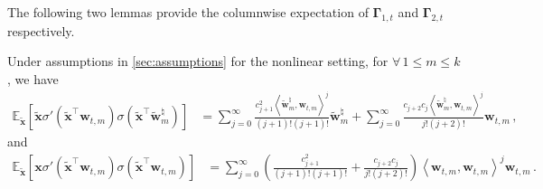 The following two lemmas provide the columnwise expectation of $\bm \Gamma_{1,t}$ and $\bm \Gamma_{2,t}$ respectively.
\begin{lemma}
\label{I-expectation}
Under assumptions in \cref{sec:assumptions} for the nonlinear setting, for $\forall\,1\leq m \leq k$, we have
    \begin{align}\label{sigma-target-model-corr}
    \mathbb{E}_{\widetilde{\bm x}}\left[\widetilde{\bm x} \sigma' \left(\widetilde{\bm x}^{\!\top}\bm w_{t,m}\right) \sigma \left(\widetilde{\bm x}^{\!\top}\widetilde{\bm w}^\natural_m\right)\right]
    & = \sum_{j=0}^{\infty}\frac{c_{j+1}^2\left\langle\widetilde{\bm w}^\natural_m,\bm w_{t,m}\right\rangle^{j}}{(j+1)!(j+1)!}\widetilde{\bm w}^\natural_m + \sum_{j= 0}^{\infty}\frac{c_{j+2}c_{j}\left\langle\widetilde{\bm w}^\natural_m,\bm w_{t,m}\right\rangle^{j}}{j!(j+2)!}\bm w_{t,m}\,,
\end{align}
and
\begin{align}
        \mathbb{E}_{\widetilde{\bm x}}\left[\bm x \sigma' \left(\widetilde{\bm x}^{\!\top}\bm w_{t,m}\right) \sigma \left(\widetilde{\bm x}^{\!\top}\bm w_{t,m}\right)\right]
        & = \sum_{j= 0}^{\infty}\left(\frac{c_{j+1}^2}{(j+1)!(j+1)!}+\frac{c_{j+2}c_{j}}{j!(j+2)!}\right)\left\langle\bm w_{t,m},\bm w_{t,m}\right\rangle^{j}\bm w_{t,m}\,.\label{sigma-target-target}
    \end{align}
\end{lemma}
